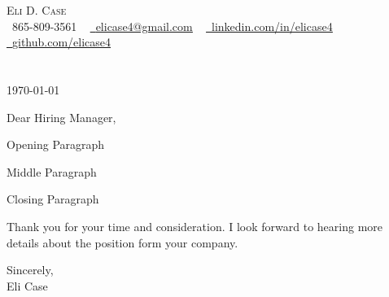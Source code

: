 \documentclass[letterpaper,11pt]{article}
\newcommand{\paragraphbreak}{\vspace{10pt}}
\begin{document}
\begin{center}
    {\large \scshape Eli D. Case} \\ \vspace{1pt}
    \small \raisebox{-0.1\height}\faPhone\ 865-809-3561 ~ \href{mailto:elicase4@gmail.com}{\raisebox{-0.2\height}\faEnvelope\  \underline{elicase4@gmail.com}} ~ 
    \href{https://linkedin.com/in/elicase4}{\raisebox{-0.2\height}\faLinkedin\ \underline{linkedin.com/in/elicase4}}  ~
    \href{https://github.com/elicase4}{\raisebox{-0.2\height}\faGithub\ \underline{github.com/elicase4}}
    \vspace{-4pt}
\end{center}

\section{}

\today \\

\paragraphbreak

Dear Hiring Manager,

\paragraphbreak

Opening Paragraph

\paragraphbreak

Middle Paragraph

\paragraphbreak

Closing Paragraph

\paragraphbreak

Thank you for your time and consideration. I look forward to hearing more details about the position form your company.

\paragraphbreak

Sincerely, \\
Eli Case
\end{document}
